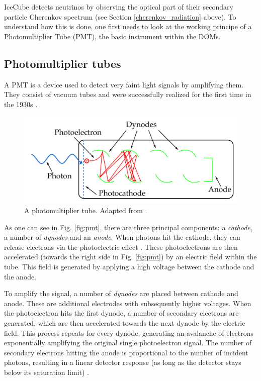 \documentclass[
    a4paper, %
    fontsize=10pt, %
    twoside=false, %
    numbers=noenddot, %
    fontmethod=tex,
]{kaobook}
\begin{document}
IceCube detects neutrinos by observing the optical part of their secondary particle Cherenkov spectrum (see Section \ref{cherenkov_radiation} above). To understand how this is done, one first needs to look at the working principe of a Photomultiplier Tube (PMT), the basic instrument within the DOMs.

\subsection{Photomultiplier tubes}
A PMT is a device used to detect very faint light signals by amplifying them. They consist of vacuum tubes and were successfully realized for the first time in the 1930s .

\begin{figure}[h!]
    \includegraphics{ic/ic_pmt_annotated.pdf}
    \caption[PMT schematic]{A photomultiplier tube. Adapted from \cite{Bednarski2014}.}
\end{figure}

As one can see in Fig. \ref{fig:pmt}, there are three principal components: a \textit{cathode}, a number of \textit{dynodes} and an \textit{anode}. When photons hit the cathode, they can release electrons via the photoelectric effect . These photoelectrons are then accelerated (towards the right side in Fig. \ref{fig:pmt}) by an electric field within the tube. This field is generated by applying a high voltage between the cathode and the anode.

To amplify the signal, a number of \textit{dynodes} are placed between cathode and anode. These are additional electrodes with subsequently higher voltages. When the photoelectron hits the first dynode, a number of secondary electrons are generated, which are then accelerated towards the next dynode by the electric field. This process repeats for every dynode, generating an avalanche of electrons exponentially amplifying the original single photoelectron signal. The number of secondary electrons hitting the anode is proportional to the number of incident photons, resulting in a linear detector response (as long as the detector stays below its saturation limit) .
\end{document}
